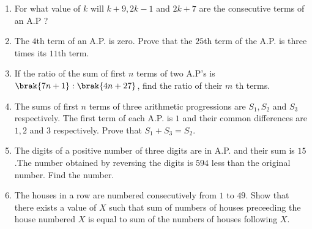 \begin{enumerate}
\item For what value of $k$ will $k+9, 2k-1$ and $2k+7$ are the consecutive terms of an A.P ?\\
\item  The $4$th term of an A.P. is zero. Prove that the $25$th term of the A.P. is three times its $11$th term.\\
\item  If the ratio of the sum of first $n$ terms of two A.P's is $\brak{7n + 1} : \brak{4n + 27}$, find the ratio of their $m$ th terms.\\
\item The sums of first $n$ terms of three arithmetic progressions are $S_1, S_2$ and $S_3$ respectively. The first term of each A.P. is $1$ and their common differences are $1, 2$ and $3$ respectively. Prove that $S_1+S_3=S_2$.\\
\item The digits of a positive number of three digits are in A.P. and their sum is $15$.The number obtained by reversing the digits is $594$ less than the original number. Find the number.\\
\item The houses in a row are numbered consecutively from $1$ to $49$. Show that there exists a value of $X$ such that sum of numbers of houses preceeding the house numbered $X$ is equal to sum of the numbers of houses following $X$.
\end{enumerate}
